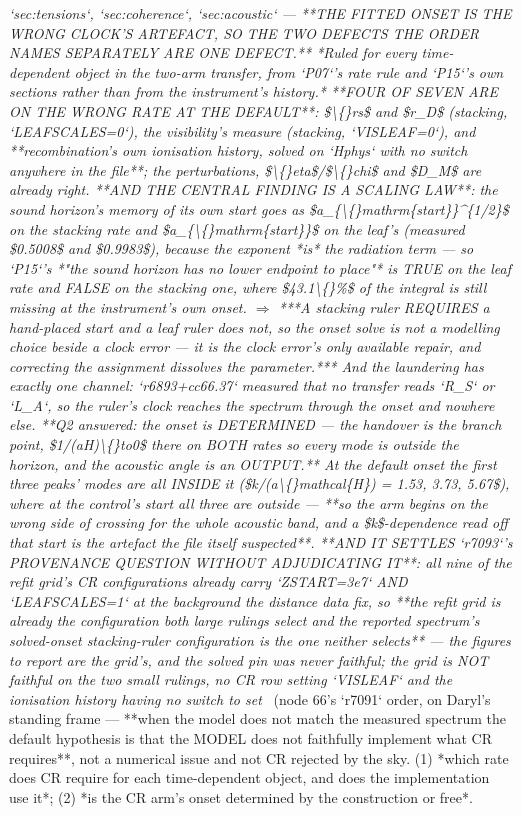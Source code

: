 \begin{description}
\textit{`sec:tensions`, `sec:coherence`, `sec:acoustic` --- **THE FITTED ONSET IS THE WRONG CLOCK'S ARTEFACT, SO THE TWO DEFECTS THE ORDER NAMES SEPARATELY ARE ONE DEFECT.** *Ruled for every time-dependent object in the two-arm transfer, from `P07`'s rate rule and `P15`'s own sections rather than from the instrument's history.*  **FOUR OF SEVEN ARE ON THE WRONG RATE AT THE DEFAULT**: \$\textbackslash\{\}rs\$ and \$r\_D\$ (stacking, `LEAFSCALES=0`), the visibility's measure (stacking, `VISLEAF=0`), and **recombination's own ionisation history, solved on `Hphys` with no switch anywhere in the file**; the perturbations, \$\textbackslash\{\}eta\$/\$\textbackslash\{\}chi\$ and \$D\_M\$ are already right.  **AND THE CENTRAL FINDING IS A SCALING LAW**: the sound horizon's memory of its own start goes as \$a\_\{\textbackslash\{\}mathrm\{start\}\}\textasciicircum{}\{1/2\}\$ on the stacking rate and \$a\_\{\textbackslash\{\}mathrm\{start\}\}\$ on the leaf's (measured \$0.5008\$ and \$0.9983\$), because the exponent *is* the radiation term --- so `P15`'s *"the sound horizon has no lower endpoint to place"* is TRUE on the leaf rate and FALSE on the stacking one, where \$43.1\textbackslash\{\}\%\$ of the integral is still missing at the instrument's own onset. \ensuremath{\Rightarrow} ***A stacking ruler REQUIRES a hand-placed start and a leaf ruler does not, so the onset solve is not a modelling choice beside a clock error --- it is the clock error's only available repair, and correcting the assignment dissolves the parameter.***  And the laundering has exactly one channel: `r6893+cc66.37` measured that no transfer reads `R\_S` or `L\_A`, so the ruler's clock reaches the spectrum through the onset and nowhere else.  **Q2 answered: the onset is DETERMINED --- the handover is the branch point, \$1/(aH)\textbackslash\{\}to0\$ there on BOTH rates so every mode is outside the horizon, and the acoustic angle is an OUTPUT.** At the default onset the first three peaks' modes are all INSIDE it (\$k/(a\textbackslash\{\}mathcal\{H\}) = 1.53, 3.73, 5.67\$), where at the control's start all three are outside --- **so the arm begins on the wrong side of crossing for the whole acoustic band, and a \$k\$-dependence read off that start is the artefact the file itself suspected**.  **AND IT SETTLES `r7093`'s PROVENANCE QUESTION WITHOUT ADJUDICATING IT**: all nine of the refit grid's CR configurations already carry `ZSTART=3e7` AND `LEAFSCALES=1` at the background the distance data fix, so **the refit grid is already the configuration both large rulings select and the reported spectrum's solved-onset stacking-ruler configuration is the one neither selects** --- the figures to report are the grid's, and the solved pin was never faithful; the grid is NOT faithful on the two small rulings, no CR row setting `VISLEAF` and the ionisation history having no switch to set} \ (node 66's `r7091` order, on Daryl's standing frame --- **when the model does not match the measured spectrum the default hypothesis is that the MODEL does not faithfully implement what CR requires**, not a numerical issue and not CR rejected by the sky. (1) *which rate does CR require for each time-dependent object, and does the implementation use it*; (2) *is the CR arm's onset determined by the construction or free*.  
\end{description}
